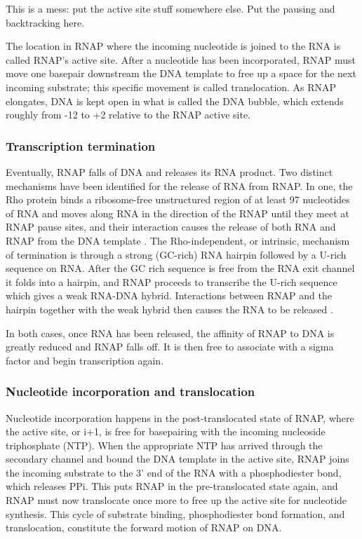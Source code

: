 This is a mess: put the active site stuff somewhere else. Put the pausing and
backtracking here.

The location in RNAP where the incoming nucleotide is joined to the RNA is
called RNAP's active site. After a nucleotide has been incorporated, RNAP must
move one basepair downstream the DNA template to free up a space for the next
incoming substrate; this specific movement is called translocation. As RNAP
elongates, DNA is kept open in what is called the DNA bubble, which extends
roughly from -12 to +2 relative to the RNAP active site.

\subsubsection{Transcription termination}
Eventually, RNAP falls of DNA and releases its RNA product. Two distinct
mechanisms have been identified for the release of RNA from RNAP. In one, the Rho
protein binds a ribosome-free unstructured region of at least 97 nucleotides of
RNA and moves along RNA in the direction of the RNAP until they meet at RNAP
pause sites, and their interaction causes the release of both RNA and RNAP from
the DNA template \cite{ciampi_rho-dependent_2006}. The
Rho-independent, or intrinsic, mechanism of termination is through a strong
(GC-rich) RNA hairpin followed by a U-rich sequence on RNA. After the GC rich
sequence is free from the RNA exit channel it folds into a hairpin, and
RNAP proceeds to transcribe the U-rich sequence which gives a weak RNA-DNA
hybrid. Interactions between RNAP and the hairpin together with the weak hybrid
then causes the RNA to be released \cite{nudler_transcription_2002}.

In both cases, once RNA has been released, the affinity of RNAP to DNA is
greatly reduced and RNAP falls off. It is then free to associate with a
sigma factor and begin transcription again.

\subsubsection{Nucleotide incorporation and translocation}
Nucleotide incorporation happens in the post-translocated state of RNAP, where
the active site, or i+1, is free for basepairing with the incoming nucleoside
triphosphate (NTP). When the appropriate NTP has arrived through the secondary
channel and bound the DNA template in the active site, RNAP joins the incoming
substrate to the 3' end of the RNA with a phosphodiester bond, which releases
PPi. This puts RNAP in the pre-translocated state again, and RNAP must now
translocate once more to free up the active site for nucleotide synthesis. This
cycle of substrate binding, phosphodiester bond formation, and translocation,
constitute the forward motion of RNAP on DNA.

